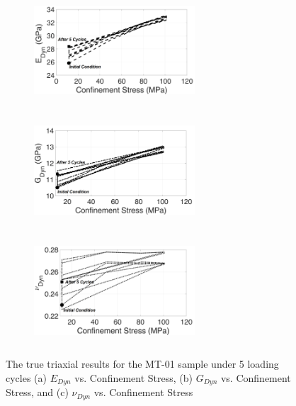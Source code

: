 \begin{figure}[ht!]
\centering
\begin{subfigure}[c]{0.48\textwidth}
\centering
\includegraphics[width=6cm,height=4cm]{figures/Amir_TrueTriaxial_MT_01_Result_E.png}
\subcaption{}
\end{subfigure}
\hfill
\begin{subfigure}[c]{0.48\textwidth}
\centering
\includegraphics[width=6cm,height=4cm]{figures/Amir_TrueTriaxial_MT_01_Result_G.png}
\subcaption{}
\end{subfigure}
\hfill
\begin{subfigure}[c]{0.48\textwidth}
\centering
\includegraphics[width=6cm,height=4cm]{figures/Amir_TrueTriaxial_MT_01_Result_Nu.png}
\subcaption{}
\end{subfigure}
\caption{The true triaxial results for the MT-01 sample under 5 loading cycles (a) $E_{Dyn}$ vs. Confinement Stress, (b) $G_{Dyn}$ vs. Confinement Stress, and (c) $\nu_{Dyn}$ vs. Confinement Stress}
\label{fig:Amir_TrueTriaxial_MT_01_Result}
\end{figure}


